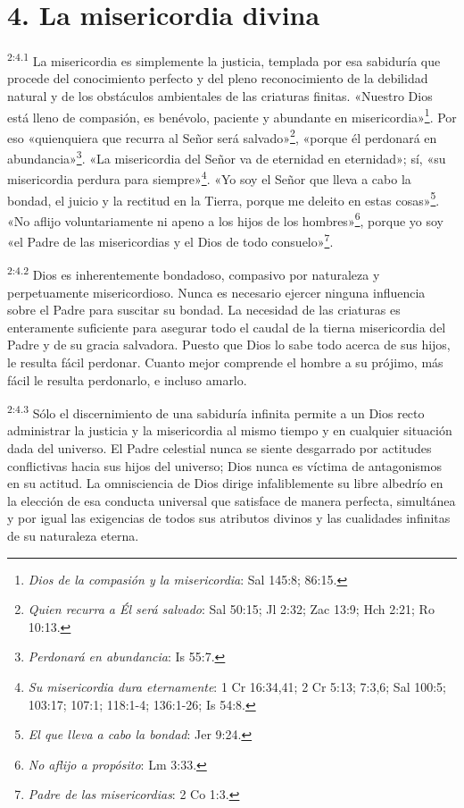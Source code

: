 \section*{4. La misericordia divina}
\par
\textsuperscript{2:4.1} La misericordia es simplemente la justicia, templada por esa sabiduría que procede del conocimiento perfecto y del pleno reconocimiento de la debilidad natural y de los obstáculos ambientales de las criaturas finitas. «Nuestro Dios está lleno de compasión, es benévolo, paciente y abundante en misericordia»\footnote{\textit{Dios de la compasión y la misericordia}: Sal 145:8; 86:15.}. Por eso «quienquiera que recurra al Señor será salvado»\footnote{\textit{Quien recurra a Él será salvado}: Sal 50:15; Jl 2:32; Zac 13:9; Hch 2:21; Ro 10:13.}, «porque él perdonará en abundancia»\footnote{\textit{Perdonará en abundancia}: Is 55:7.}. «La misericordia del Señor va de eternidad en eternidad»; sí, «su misericordia perdura para siempre»\footnote{\textit{Su misericordia dura eternamente}: 1 Cr 16:34,41; 2 Cr 5:13; 7:3,6; Sal 100:5; 103:17; 107:1; 118:1-4; 136:1-26; Is 54:8.}. «Yo soy el Señor que lleva a cabo la bondad, el juicio y la rectitud en la Tierra, porque me deleito en estas cosas»\footnote{\textit{El que lleva a cabo la bondad}: Jer 9:24.}. «No aflijo voluntariamente ni apeno a los hijos de los hombres»\footnote{\textit{No aflijo a propósito}: Lm 3:33.}, porque yo soy «el Padre de las misericordias y el Dios de todo consuelo»\footnote{\textit{Padre de las misericordias}: 2 Co 1:3.}.

\par
\textsuperscript{2:4.2} Dios es inherentemente bondadoso, compasivo por naturaleza y perpetuamente misericordioso. Nunca es necesario ejercer ninguna influencia sobre el Padre para suscitar su bondad. La necesidad de las criaturas es enteramente suficiente para asegurar todo el caudal de la tierna misericordia del Padre y de su gracia salvadora. Puesto que Dios lo sabe todo acerca de sus hijos, le resulta fácil perdonar. Cuanto mejor comprende el hombre a su prójimo, más fácil le resulta perdonarlo, e incluso amarlo.

\par
\textsuperscript{2:4.3} Sólo el discernimiento de una sabiduría infinita permite a un Dios recto administrar la justicia y la misericordia al mismo tiempo y en cualquier situación dada del universo. El Padre celestial nunca se siente desgarrado por actitudes conflictivas hacia sus hijos del universo; Dios nunca es víctima de antagonismos en su actitud. La omnisciencia de Dios dirige infaliblemente su libre albedrío en la elección de esa conducta universal que satisface de manera perfecta, simultánea y por igual las exigencias de todos sus atributos divinos y las cualidades infinitas de su naturaleza eterna.

